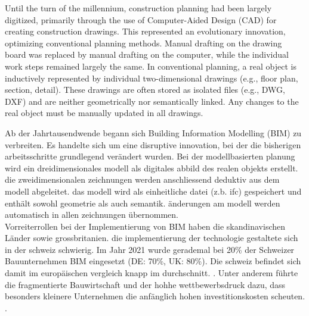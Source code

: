 \begin{English}
    Until the turn of the millennium, construction planning had been largely digitized, primarily through the use of Computer-Aided Design (CAD) for creating construction drawings. This represented an evolutionary innovation, optimizing conventional planning methods. Manual drafting on the drawing board was replaced by manual drafting on the computer, while the individual work steps remained largely the same. In conventional planning, a real object is inductively represented by individual two-dimensional drawings (e.g., floor plan, section, detail). These drawings are often stored as isolated files (e.g., DWG, DXF) and are neither geometrically nor semantically linked. Any changes to the real object must be manually updated in all drawings. \\
\end{English}

\begin{German}
    Ab der Jahrtausendwende begann sich Building Information Modelling (BIM) zu verbreiten. Es handelte sich um eine disruptive innovation, bei der die bisherigen arbeitsschritte grundlegend verändert wurden. Bei der modellbasierten planung wird ein dreidimensionales modell als digitales abbild des realen objekts erstellt. die zweidimensionalen zeichnungen werden anschliessend deduktiv aus dem modell abgeleitet. das modell wird als einheitliche datei (z.b. ifc) gespeichert und enthält sowohl geometrie als auch semantik. änderungen am modell werden automatisch in allen zeichnungen übernommen. \\
    Vorreiterrollen bei der Implementierung von BIM haben die skandinavischen Länder sowie grossbritanien. die implementierung der technologie gestaltete sich in der schweiz schwierig. Im Jahr 2021 wurde gerademal bei 20\% der Schweizer Bauunternehmen BIM eingesetzt (DE: 70\%, UK: 80\%). Die schweiz befindet sich damit im europäischen vergleich knapp im durchschnitt. \cite{heinrichSchweizImBIMEuropavergleich2022}. Unter anderem führte die fragmentierte Bauwirtschaft und der hohhe wettbewerbsdruck dazu, dass besonders kleinere Unternehmen die anfänglich hohen investitionskosten scheuten. \cite{ivanicErfolgreicheEinfuehrungBuilding2020}. \\
\end{German}

